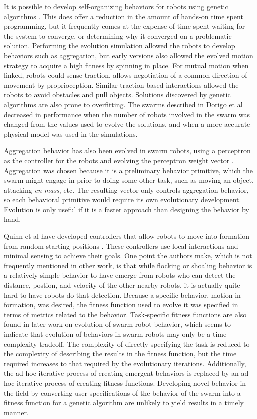 \documentclass[]{article}
\begin{document}
It is possible to develop self-organizing behaviors for robots using genetic algorithms \cite{dorigo2004evolving}. 
This does offer a reduction in the amount of hands-on time spent programming, but it frequently comes at the expense of time spent waiting for the system to converge, or determining why it converged on a problematic solution. 
Performing the evolution simulation allowed the robots to develop behaviors such as aggregation, but early versions also allowed the evolved motion strategy to acquire a high fitness by spinning in place. 
For mutual motion when linked, robots could sense traction, allows negotiation of a common direction of movement by proprioception. 
Similar traction-based interactions allowed the robots to avoid obstacles and pull objects. 
Solutions discovered by genetic algorithms are also prone to overfitting. 
The swarms described in Dorigo et al decreased in performance when the number of robots involved in the swarm was changed from the values used to evolve the solutions, and when a more accurate physical model was used in the simulations.

Aggregation behavior has also been evolved in swarm robots, using a perceptron as the controller for the robots and evolving the perceptron weight vector \cite{bahgecci2005evolving}. 
Aggregation was chosen because it is a preliminary behavior primitive, which the swarm might engage in prior to doing some other task, such as moving an object, attacking \emph{en mass}, etc.
The resulting vector only controls aggregation behavior, so each behavioral primitive would require its own evolutionary development. 
Evolution is only useful if it is a faster approach than designing the behavior by hand. 

Quinn et al have developed controllers that allow robots to move into formation from random starting positions \cite{quinn2003evolving}. 
These controllers use local interactions and minimal sensing to achieve their goals. 
One point the authors make, which is not frequently mentioned in other work, is that while flocking or shoaling behavior is a relatively simple behavior to have emerge from robots who can detect the distance, postion, and velocity of the other nearby robots, it is actually quite hard to have robots do that detection. 
Because a specific behavior, motion in formation, was desired, the fitness function used to evolve it was specified in terms of metrics related to the behavior. 
Task-specific fitness functions are also found in later work on evolution of swarm robot behavior, which seems to indicate that evolution of behaviors in swarm robots may only be a time-complexity tradeoff. 
The complexity of directly specifying the task is reduced to the complexity of describing the results in the fitness function, but the time required increases to that required by the evolutionary iterations. 
Additionally, the ad hoc iterative process of creating emergent behaviors is replaced by an ad hoc iterative process of creating fitness functions.
Developing novel behavior in the field by converting user specifications of the behavior of the swarm into a fitness function for a genetic algorithm are unlikely to yield results in a timely manner. 
\end{document}
